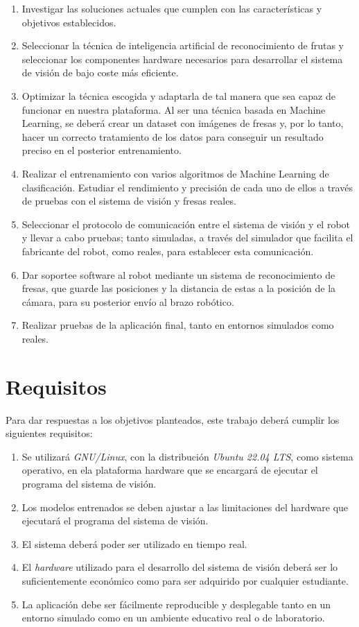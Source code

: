 \begin{enumerate}
  \item Investigar las soluciones actuales que cumplen con las características y objetivos establecidos.
  \item Seleccionar la técnica de inteligencia artificial de reconocimiento de frutas y seleccionar los componentes hardware necesarios para desarrollar el sistema de visión de bajo coste más eficiente.
  \item Optimizar la técnica escogida y adaptarla de tal manera que sea capaz de funcionar en nuestra plataforma. Al ser una técnica basada en Machine Learning, se deberá crear un dataset con imágenes de fresas y, por lo tanto, hacer un correcto tratamiento de los datos para conseguir un resultado preciso en el posterior entrenamiento.
  \item Realizar el entrenamiento con varios algoritmos de Machine Learning de
clasificación. Estudiar el rendimiento y precisión de cada uno de ellos a través de pruebas con el sistema de visión y fresas reales.
  \item Seleccionar el protocolo de comunicación entre el sistema de visión y el robot y llevar a cabo pruebas; tanto simuladas, a través del simulador que facilita el fabricante del robot, como reales, para establecer esta comunicación.
  \item Dar soportee software al robot mediante un %
sistema de reconocimiento de fresas, que guarde las posiciones y la distancia de estas a la posición de la cámara, para su posterior envío al brazo robótico.
  \item Realizar pruebas de la aplicación final, tanto en entornos simulados como reales.
\end{enumerate} 


\section{Requisitos}
\label{sec:requisitos}

Para dar respuestas a los objetivos planteados, este trabajo deberá cumplir los siguientes requisitos:

\begin{enumerate}
  \item Se utilizará \textit{GNU/Linux}, con la distribución \textit{Ubuntu 22.04 LTS}, como sistema operativo, en ela plataforma hardware que se encargará de ejecutar el programa del sistema de visión.
  \item Los modelos entrenados se deben ajustar a las limitaciones del hardware que ejecutará el programa del sistema de visión.
  \item El sistema deberá poder ser utilizado en tiempo real. 
  \item El \textit{hardware} utilizado para el desarrollo del sistema de visión deberá ser lo suficientemente económico como para ser adquirido por cualquier estudiante.
  \item La aplicación debe ser fácilmente reproducible y desplegable tanto en un entorno simulado como en un ambiente educativo real o de laboratorio.
\end{enumerate}  

